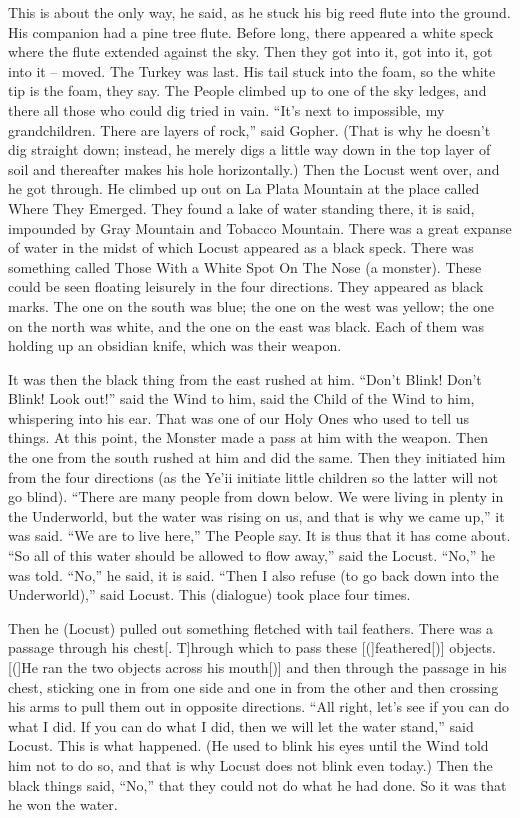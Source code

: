 This is about the only way, he said, as he stuck his big reed flute into the ground. His companion had a pine tree flute. Before long, there appeared a white speck where the flute extended against the sky. Then they got into it, got into it, got into it -- moved. The Turkey was last. His tail stuck into the foam, so the white tip is the foam, they say. The People climbed up to one of the sky ledges, and there all those who could dig tried in vain. ``It's next to impossible, my grandchildren. There are layers of rock,'' said Gopher. (That is why he doesn't dig straight down; instead, he merely digs a little way down in the top layer of soil and thereafter makes his hole horizontally.) Then the Locust went over, and he got through. He climbed up out on La Plata Mountain at the place called Where They Emerged. They found a lake of water standing there, it is said, impounded by Gray Mountain and Tobacco Mountain. There was a great expanse of water in the midst of which Locust appeared as a black speck. There was something called Those With a White Spot On The Nose (a monster). These could be seen floating leisurely in the four directions. They appeared as black marks. The one on the south was blue; the one on the west was yellow; the one on the north was white, and the one on the east was black. Each of them was holding up an obsidian knife, which was their weapon.

It was then the black thing from the east rushed at him. ``Don't Blink! Don't Blink! Look out!'' said the Wind to him, said the Child of the Wind to him, whispering into his ear. That was one of our Holy Ones who used to tell us things. At this point, the Monster made a pass at him with the weapon. Then the one from the south rushed at him and did the same. Then they initiated him from the four directions (as the Ye'ii initiate little children so the latter will not go blind). ``There are many people from down below. We were living in plenty in the Underworld, but the water was rising on us, and that is why we came up,'' it was said. ``We are to live here,'' The People say. It is thus that it has come about. ``So all of this water should be allowed to flow away,'' said the Locust. ``No,'' he was told. ``No,'' he said, it is said. ``Then I also refuse (to go back down into the Underworld),'' said Locust. This (dialogue) took place four times.

Then he (Locust) pulled out something fletched with tail feathers. There was a passage through his chest[. T]hrough which to pass these [(]feathered[)] objects. [(]He ran the two objects across his mouth[)] and then through the passage in his chest, sticking one in from one side and one in from the other and then crossing his arms to pull them out in opposite directions. ``All right, let's see if you can do what I did. If you can do what I did, then we will let the water stand,'' said Locust. This is what happened. (He used to blink his eyes until the Wind told him not to do so, and that is why Locust does not blink even today.) Then the black things said, ``No,'' that they could not do what he had done. So it was that he won the water.

